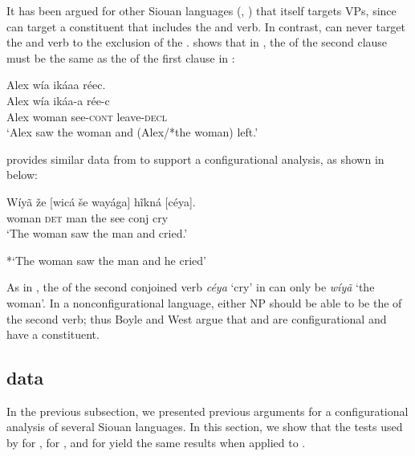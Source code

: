 \documentclass[output=paper]{LSP/langsci}
\begin{document}
It has been argued for other Siouan languages (\citealt{Boyle2007}, \citealt{West2003}) that  itself targets VPs, since  can target a constituent that includes the  and verb. In contrast,  can never target the  and verb to the exclusion of the .  \citet{Boyle2007} shows that in , the  of the second clause must be the same as the  of the first clause in :

\begin{exe}
\ex\label{ex:jrs:29} 
\glll Alex w\'ia ik\'aaa r\'eec.\\
Alex w\'ia ik\'aa-a r\'ee-c \\
Alex woman see-\textsc{cont} leave-\textsc{decl} \\
\trans `Alex saw the woman and (Alex/*the woman) left.' \citep[217]{Boyle2007} 
\end{exe}

\citet{West2003} provides similar data from  to support a configurational analysis, as shown in  below:

\begin{exe}
\ex\label{ex:jrs:30} \gll W\'iy\~a 	 \v{z}e 		[wic\'a 	\v{s}e 	way\'aga] h\~ikn\'a 	[c\'eya]. \\
woman 	\textsc{det} 	man 		the see 				conj 		cry \\
\trans `The woman saw the man and cried.'

*`The woman saw the man and he cried' \citep[34]{West2003}
\end{exe}

As in , the  of the second conjoined verb \textit{c\'eya} `cry' in  can only be \textit{w\'iy\~a} `the woman'.  In a nonconfigurational language, either NP should be able to be the  of the second verb; thus Boyle and West argue that  and  are configurational and have a  constituent.

\subsection{ data}

In the previous subsection, we presented previous arguments for a configurational analysis of several Siouan languages.  In this section, we show that the tests used by \citet{Boyle2007} for , \citet{Graczyk1991a} for , and \citet{West2003} for  yield the same results when applied to .
	
\end{document}
